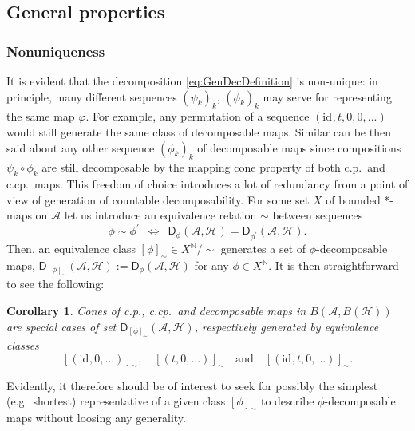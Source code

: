 \documentclass[reqno]{amsart}
\theoremstyle{plain}
\newtheorem{corollary}{Corollary}
\numberwithin{equation}{section}
\numberwithin{theorem}{section}
\numberwithin{lemma}{section}
\numberwithin{definition}{section}
\numberwithin{corollary}{section}
\numberwithin{remark}{section}
\newcommand{\naturals}{\mathbb{N}}
\newcommand{\id}[1]{\mathrm{id}_{#1}}
\newcommand{\hilbert}{\mathcal{H}}
\newcommand{\gdec}[3]{\mathsf{D}_{#1}(#2,#3)}
\newcommand{\transpose}{t}
\begin{document}
\subsection{General properties}

\subsubsection{Nonuniqueness}

It is evident that the decomposition \eqref{eq:GenDecDefinition} is non-unique: in principle, many different sequences $\left(\psi_k\right)_k$, $\left(\phi_k\right)_k$ may serve for representing the same map $\varphi$. For example, any permutation of a sequence $(\id{},\transpose,0,0,...)$ would still generate the same class of decomposable maps. Similar can be then said about any other sequence $\left(\phi_k\right)_k$ of decomposable maps since compositions $\psi_k\circ\phi_k$ are still decomposable by the mapping cone property of both c.p.~and c.cp.~maps. This freedom of choice introduces a lot of redundancy from a point of view of generation of countable decomposability. For some set $X$ of bounded *-maps on $\mathscr{A}$ let us introduce an equivalence relation $\sim$ between sequences
\begin{equation}
    \phi \sim \phi^\prime \,\,\,\Leftrightarrow \,\,\, \gdec{\phi}{\mathscr{A}}{\hilbert} = \gdec{\phi^\prime}{\mathscr{A}}{\hilbert}.
\end{equation}
Then, an equivalence class $\left[\phi\right]_\sim \in X^\naturals / \sim$ generates a set of $\phi$-decomposable maps, $\gdec{\left[\phi\right]_\sim}{\mathscr{A}}{\hilbert} := \gdec{\phi}{\mathscr{A}}{\hilbert}$ for any $\phi\in X^\naturals$. It is then straightforward to see the following:

\begin{corollary}
    Cones of c.p., c.cp.~and decomposable maps in $B(\mathscr{A},B(\hilbert))$ are special cases of set $\gdec{[\phi]_\sim}{\mathscr{A}}{\hilbert}$, respectively generated by equivalence classes
    \begin{equation}
        \left[(\id{}, 0, ...)\right]_\sim, \quad \left[(\transpose, 0, ...)\right]_\sim \quad \text{and} \quad \left[(\id{}, \transpose, 0, ...)\right]_\sim.
    \end{equation}
\end{corollary}

Evidently, it therefore should be of interest to seek for possibly the simplest (e.g.~shortest) representative of a given class $\left[\phi\right]_\sim$ to describe $\phi$-decomposable maps without loosing any generality.
\end{document}
